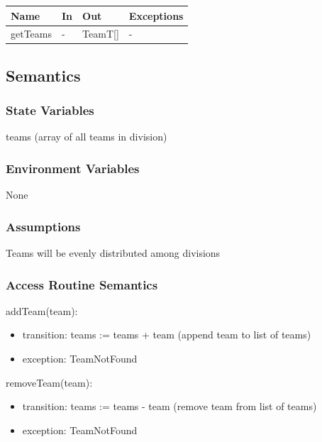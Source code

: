 \documentclass[12pt, titlepage]{article}
\begin{document}
\begin{center}
  \begin{tabular}{p{2cm} p{4cm} p{4cm} p{2cm}}
    \hline
    \textbf{Name}    & \textbf{In} & \textbf{Out} & \textbf{Exceptions} \\
    \hline
    getTeams & -           & TeamT[]            & -                   \\
    \hline
  \end{tabular}
\end{center}

\subsection{Semantics}

\subsubsection{State Variables}

teams (array of all teams in division)

\subsubsection{Environment Variables}

None

\subsubsection{Assumptions}

Teams will be evenly distributed among divisions

\subsubsection{Access Routine Semantics}

\noindent addTeam(team):
\begin{itemize}
  \item transition: teams := teams + team (append team to list of teams)
  \item exception: TeamNotFound
\end{itemize}

\noindent removeTeam(team):
\begin{itemize}
  \item transition: teams := teams - team (remove team from list of teams)
  \item exception: TeamNotFound
\end{itemize}
\end{document}
